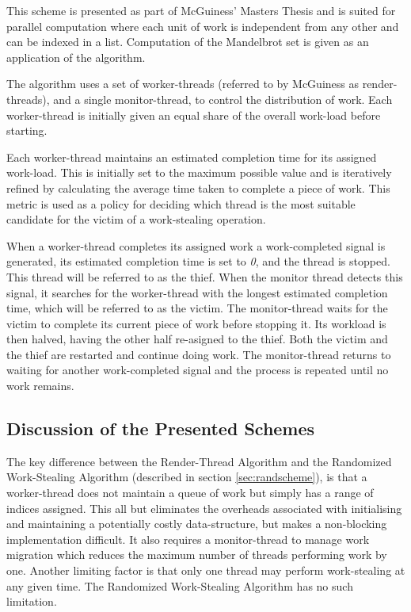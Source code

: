 This scheme is presented as part of McGuiness' Masters Thesis \cite{jmcguin} and is suited for parallel computation where each unit of work is independent 
from any other and can be indexed in a list. Computation of the Mandelbrot set is given as an application of the algorithm. 

The algorithm uses a set of \glspl{worker-thread} (referred to by McGuiness as render-threads), 
and a single \gls{monitor-thread}, to control the distribution of work. Each \gls{worker-thread} is
initially given an equal share of the overall work-load before starting.

Each \gls{worker-thread} maintains an estimated completion time for its assigned work-load. This is initially set to the maximum possible value and
is iteratively refined by calculating the average time taken to complete a piece of work. This metric is used as a policy for deciding which
thread is the most suitable candidate for the victim of a work-stealing operation.

When a worker-thread completes its assigned work a work-completed signal is generated, its estimated
completion time is set to \textit{0}, and the thread is stopped. This thread will be referred to as the \gls{thief}.
When the monitor thread detects this signal, it searches for the worker-thread with the longest estimated completion time, 
which will be referred to as the \gls{victim}. The \gls{monitor-thread} waits for the victim to complete its current piece of work before stopping it.
Its workload is then halved, having the other half re-asigned to the thief. Both the victim and the thief are restarted and continue doing work.
The monitor-thread returns to waiting for another work-completed signal and the process is repeated until no work remains.


\subsection*{Discussion of the Presented Schemes}
The key difference between the Render-Thread Algorithm and the Randomized Work-Stealing Algorithm (described in section \ref{sec:randscheme}), 
is that a \gls{worker-thread} does not maintain a queue of work but simply has a range of indices assigned. 
This all but eliminates the overheads associated with initialising and 
maintaining a potentially costly data-structure, but makes a \gls{non-blocking} implementation difficult. It also requires a monitor-thread to manage
work migration which reduces the maximum number of threads performing work by one. 
Another limiting factor is that only one thread may perform work-stealing at any given time. The Randomized Work-Stealing Algorithm has no such limitation.

